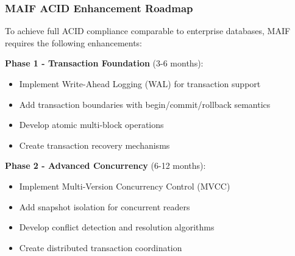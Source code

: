 \documentclass[conference]{IEEEtran}
\begin{document}
\begin{itemize}[leftmargin=*]

\subsubsection{MAIF ACID Enhancement Roadmap}

To achieve full ACID compliance comparable to enterprise databases, MAIF requires the following enhancements:

\textbf{Phase 1 - Transaction Foundation} (3-6 months):
\begin{itemize}[leftmargin=*]
\item Implement Write-Ahead Logging (WAL) for transaction support
\item Add transaction boundaries with begin/commit/rollback semantics
\item Develop atomic multi-block operations
\item Create transaction recovery mechanisms
\end{itemize}

\textbf{Phase 2 - Advanced Concurrency} (6-12 months):
\begin{itemize}[leftmargin=*]
\item Implement Multi-Version Concurrency Control (MVCC)
\item Add snapshot isolation for concurrent readers
\item Develop conflict detection and resolution algorithms
\item Create distributed transaction coordination
\end{itemize}


\end{itemize}
\end{document}
